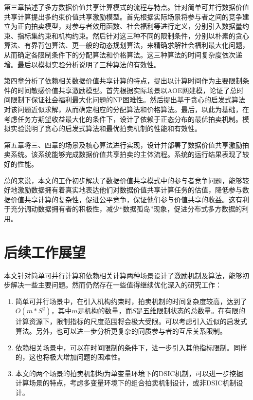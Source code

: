 \documentclass[promaster]{thesis-uestc}
\begin{document}
第三章描述了多方数据价值共享计算模式的流程与特点。针对简单可并行数据价值共享计算提出多约束价值共享激励模型。首先根据实际场景将参与者之间的竞争建立为正向拍卖模型，对参与者效用函数、社会福利等进行定义，分别引入数据量约束、指标集约束和机构约束。然后针对这三种不同的限制条件，分别以朴素的贪心算法、有界背包算法、更一般的动态规划算法，来精确求解社会福利最大化问题，从而确定各限制条件下的分配算法和价格算法。这三种算法的时间复杂度依次递增。最后以模拟实验分析说明了三种算法的有效性。

第四章分析了依赖相关数据价值共享计算的特点，提出以计算时间作为主要限制条件的时间敏感价值共享激励模型。首先根据实际场景以AOE网建模，论证了总时间限制下保证社会福利最大化问题的NP困难性。然后提出基于贪心的启发式算法对该问题近似求解，从而确定相应的分配算法和价格算法。最后，以此为基础，在考虑任务方期望收益最大化的条件下，设计了依赖于正态分布的最优拍卖机制。模拟实验说明了贪心的启发式算法和最优拍卖机制的性能和有效性。

第五章将三、四章的场景及核心算法进行实现，设计并部署了数据价值共享激励拍卖系统。该系统能够完成数据价值共享拍卖的主体流程。系统的运行结果表现了较好的性能。

总的来说，本文的工作初步解决了数据价值共享模式中的参与者竞争问题，能够较好地激励数据拥有着真实地表达他们对数据价值共享计算任务的估值，降低参与数据价值共享计算的复杂性，促进公平竞争，保证他们参与价值共享的收益。这有利于充分调动数据拥有者的积极性，减少“数据孤岛”现象，促进分布式多方数据的利用。

\section{后续工作展望}
本文针对简单可并行计算和依赖相关计算两种场景设计了激励机制及算法，能够初步解决一些主要问题。然而仍然存在一些值得继续优化深入的研究工作：

\begin{enumerate}
    \item 简单可并行场景中，在引入机构约束时，拍卖机制的时间复杂度较高，达到了$O(m*S^2)$，其中$m$是机构的数量，而$S$是五维限制状态的总数量。在有限的计算资源下，限制指标的尺度范围将会极大受限。可以考虑引入近似的启发式算法。另外，也可以进一步分析更复杂的同质参与者的互斥关系限制。
    \item 依赖相关场景中，可以在时间限制的条件下，进一步引入其他指标限制。同样的，这也将极大增加问题的困难性。
    \item 本文的两个场景的拍卖机制均为单变量环境下的DSIC机制，可以进一步挖掘计算场景的特点，考虑多变量环境下的组合拍卖机制设计，或非DSIC机制设计。
\end{enumerate}
\end{document}
